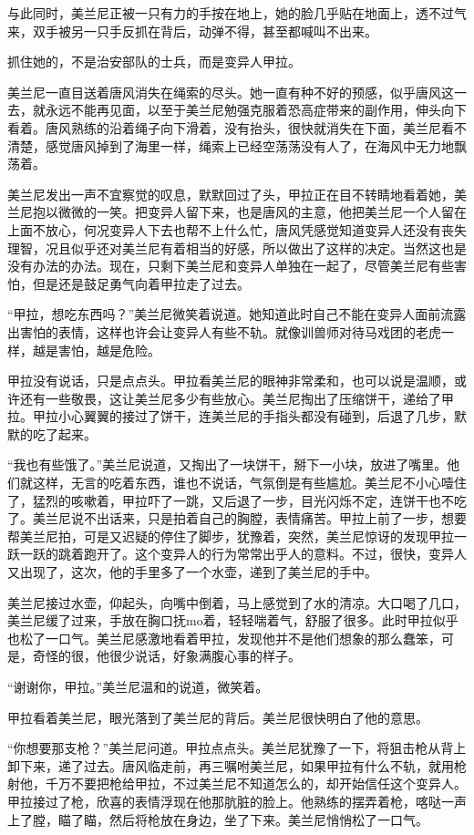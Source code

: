 与此同时，美兰尼正被一只有力的手按在地上，她的脸几乎贴在地面上，透不过气来，双手被另一只手反抓在背后，动弹不得，甚至都喊叫不出来。

抓住她的，不是治安部队的士兵，而是变异人甲拉。

美兰尼一直目送着唐风消失在绳索的尽头。她一直有种不好的预感，似乎唐风这一去，就永远不能再见面，以至于美兰尼勉强克服着恐高症带来的副作用，伸头向下看着。唐风熟练的沿着绳子向下滑着，没有抬头，很快就消失在下面，美兰尼看不清楚，感觉唐风掉到了海里一样，绳索上已经空荡荡没有人了，在海风中无力地飘荡着。

美兰尼发出一声不宜察觉的叹息，默默回过了头，甲拉正在目不转睛地看着她，美兰尼抱以微微的一笑。把变异人留下来，也是唐风的主意，他把美兰尼一个人留在上面不放心，何况变异人下去也帮不上什么忙，唐风凭感觉知道变异人还没有丧失理智，况且似乎还对美兰尼有着相当的好感，所以做出了这样的决定。当然这也是没有办法的办法。现在，只剩下美兰尼和变异人单独在一起了，尽管美兰尼有些害怕，但是还是鼓足勇气向着甲拉走了过去。

“甲拉，想吃东西吗？”美兰尼微笑着说道。她知道此时自己不能在变异人面前流露出害怕的表情，这样也许会让变异人有些不轨。就像训兽师对待马戏团的老虎一样，越是害怕，越是危险。

甲拉没有说话，只是点点头。甲拉看美兰尼的眼神非常柔和，也可以说是温顺，或许还有一些敬畏，这让美兰尼多少有些放心。美兰尼掏出了压缩饼干，递给了甲拉。甲拉小心翼翼的接过了饼干，连美兰尼的手指头都没有碰到，后退了几步，默默的吃了起来。

“我也有些饿了。”美兰尼说道，又掏出了一块饼干，掰下一小块，放进了嘴里。他们就这样，无言的吃着东西，谁也不说话，气氛倒是有些尴尬。美兰尼不小心噎住了，猛烈的咳嗽着，甲拉吓了一跳，又后退了一步，目光闪烁不定，连饼干也不吃了。美兰尼说不出话来，只是拍着自己的胸膛，表情痛苦。甲拉上前了一步，想要帮美兰尼拍，可是又迟疑的停住了脚步，犹豫着，突然，美兰尼惊讶的发现甲拉一跃一跃的跳着跑开了。这个变异人的行为常常出乎人的意料。不过，很快，变异人又出现了，这次，他的手里多了一个水壶，递到了美兰尼的手中。

美兰尼接过水壶，仰起头，向嘴中倒着，马上感觉到了水的清凉。大口喝了几口，美兰尼缓了过来，手放在胸口抚mo着，轻轻喘着气，舒服了很多。此时甲拉似乎也松了一口气。美兰尼感激地看着甲拉，发现他并不是他们想象的那么蠢笨，可是，奇怪的很，他很少说话，好象满腹心事的样子。

“谢谢你，甲拉。”美兰尼温和的说道，微笑着。

甲拉看着美兰尼，眼光落到了美兰尼的背后。美兰尼很快明白了他的意思。

“你想要那支枪？”美兰尼问道。甲拉点点头。美兰尼犹豫了一下，将狙击枪从背上卸下来，递了过去。唐风临走前，再三嘱咐美兰尼，如果甲拉有什么不轨，就用枪射他，千万不要把枪给甲拉，不过美兰尼不知道怎么的，却开始信任这个变异人。甲拉接过了枪，欣喜的表情浮现在他那肮脏的脸上。他熟练的摆弄着枪，喀哒一声上了膛，瞄了瞄，然后将枪放在身边，坐了下来。美兰尼悄悄松了一口气。

